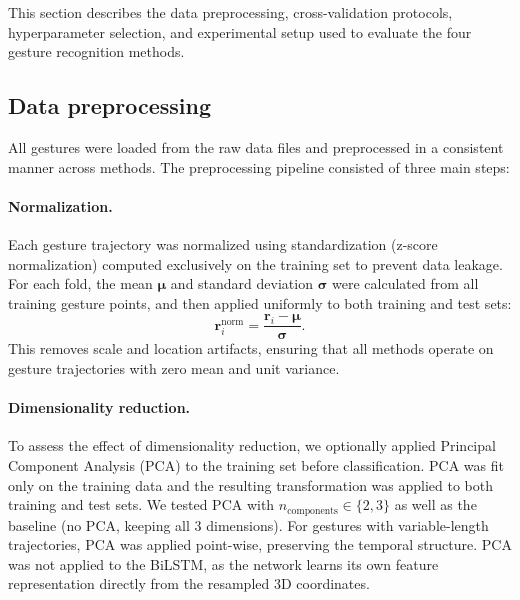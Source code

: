 

This section describes the data preprocessing, cross-validation protocols,
hyperparameter selection, and experimental setup used to evaluate the four
gesture recognition methods.
 
\subsection{Data preprocessing}
 
All gestures were loaded from the raw data files and preprocessed in a
consistent manner across methods. The preprocessing pipeline consisted of three
main steps:
 
\paragraph{Normalization.} Each gesture trajectory was normalized using
standardization (z-score normalization) computed exclusively on the training
set to prevent data leakage. For each fold, the mean $\boldsymbol{\mu}$ and
standard deviation $\boldsymbol{\sigma}$ were calculated from all training
gesture points, and then applied uniformly to both training and test sets:
\begin{equation}
    \mathbf{r}^{\text{norm}}_i = \frac{\mathbf{r}_i - \boldsymbol{\mu}}{\boldsymbol{\sigma}} .
\end{equation}
This removes scale and location artifacts, ensuring that all methods operate on
gesture trajectories with zero mean and unit variance.
 
\paragraph{Dimensionality reduction.} To assess the effect of
dimensionality reduction, we optionally applied Principal Component Analysis
(PCA) to the training set before classification. PCA was fit only on the
training data and the resulting transformation was applied to both training and
test sets. We tested PCA with $n_{\text{components}} \in \{2, 3\}$ as well
as the baseline (no PCA, keeping all 3 dimensions). For gestures with
variable-length trajectories, PCA was applied point-wise, preserving the
temporal structure. PCA was not applied to the BiLSTM, as the network learns its own
feature representation directly from the resampled 3D coordinates.
 
